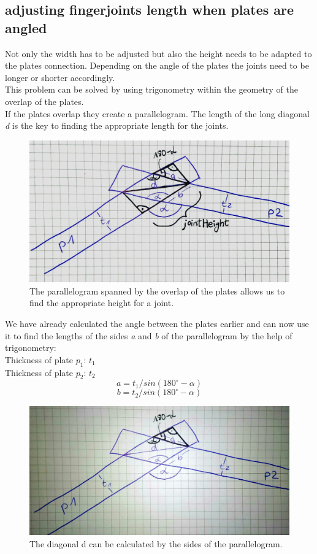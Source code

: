 \documentclass[../ClassicThesis.tex]{subfiles}
\begin{document}
\subsection{adjusting fingerjoints length when plates are angled}
    Not only the width has to be adjusted but also the height needs to be adapted to the plates connection. Depending on the angle of the plates the joints need to be longer or shorter accordingly.\\
    This problem can be solved by using trigonometry within the geometry of the overlap of the plates.\\
    If the plates overlap they create a parallelogram. The length of the long diagonal \emph{d} is the key to finding the appropriate length for the joints.
    \begin{figure}[!ht]
    \centering
    \includegraphics[width=0.5\columnwidth]{Images/06-2-joints-newJointHeight1.jpg}
    \caption{The parallelogram spanned by the overlap of the plates allows us to find the appropriate height for a joint.}
    \end{figure}
    
    We have already calculated the angle between the plates earlier and can now use it to find the lengths of the sides \emph{a} and \emph{b} of the parallelogram by the help of trigonometry:\\
    Thickness of plate $p_1$: $t_1$\\
    Thickness of plate $p_2$: $t_2$
    $$ a = t_1 / sin(180^{\circ} - \alpha)$$
    $$ b = t_2 / sin(180^{\circ} - \alpha)$$
    \begin{figure}[!ht]
    \centering
    \includegraphics[width=0.5\columnwidth]{Images/06-2-joints-newJointHeight2.jpg}
    \caption{The diagonal d can be calculated by the sides of the parallelogram.}
    \end{figure}
    
\end{document}
